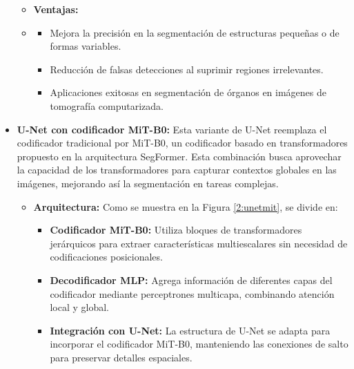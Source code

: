 \begin{itemize}
\begin{itemize}
\item \textbf{Ventajas:} 
\item 
\begin{itemize} 
\item Mejora la precisión en la segmentación de estructuras pequeñas o de formas variables. \parencite{oktay2018attentionunet}
\item Reducción de falsas detecciones al suprimir regiones irrelevantes. \parencite{oktay2018attentionunet}
\item Aplicaciones exitosas en segmentación de órganos en imágenes de tomografía computarizada. \parencite{oktay2018attentionunet}
\end{itemize}
\end{itemize}


   \item \textbf{U-Net con codificador MiT-B0:} Esta variante de U-Net reemplaza el codificador tradicional por MiT-B0, un codificador basado en transformadores propuesto en la arquitectura SegFormer. Esta combinación busca aprovechar la capacidad de los transformadores para capturar contextos globales en las imágenes, mejorando así la segmentación en tareas complejas. \parencite{Yeom2025}

\begin{itemize} 
    \item \textbf{Arquitectura:} Como se muestra en la Figura \ref{2:unetmit}, se divide en:
    \begin{itemize} 
        \item \textbf{Codificador MiT-B0:} Utiliza bloques de transformadores jerárquicos para extraer características multiescalares sin necesidad de codificaciones posicionales. \parencite{Yeom2025}
        \item \textbf{Decodificador MLP:} Agrega información de diferentes capas del codificador mediante perceptrones multicapa, combinando atención local y global. \parencite{Yeom2025}
        \item \textbf{Integración con U-Net:} La estructura de U-Net se adapta para incorporar el codificador MiT-B0, manteniendo las conexiones de salto para preservar detalles espaciales. \parencite{Yeom2025}
    \end{itemize}


\end{itemize}
\end{itemize}
